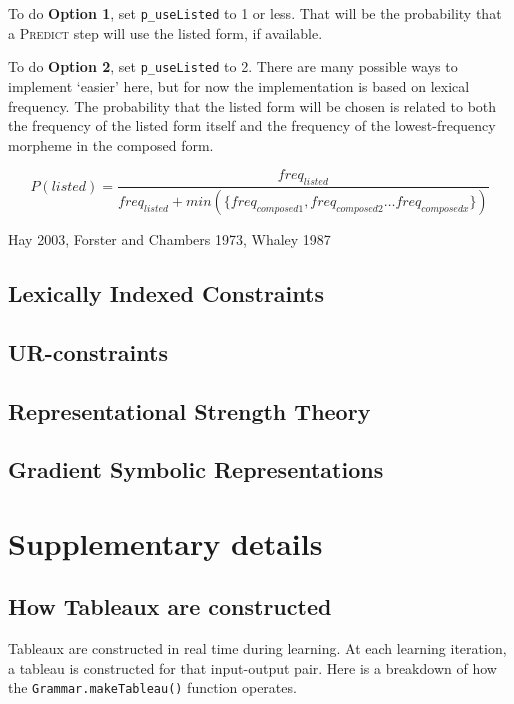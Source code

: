 \documentclass[12]{article}
\begin{document}
		To do {\bf Option 1}, set \texttt{p\_useListed} to 1 or less.  That will be the probability that a \textsc{Predict} step will use the listed form, if available.
		
		To do {\bf Option 2}, set \texttt{p\_useListed} to 2. There are many possible ways to implement `easier' here, but for now the implementation is based on lexical frequency.  The probability that the listed form will be chosen is related to both the frequency of the listed form itself and the frequency of the lowest-frequency morpheme in the composed form.  
		
		\[
		P(listed) = \frac{freq_{listed}}{freq_{listed} + min(\{freq_{composed1}, freq_{composed2}\ldots freq_{composedx}\})}
		\]
		
		Hay 2003, Forster and Chambers 1973, Whaley 1987 %

	\subsection{Lexically Indexed Constraints}

	\subsection{UR-constraints}

	\subsection{Representational Strength Theory}

	\subsection{Gradient Symbolic Representations}


\section{Supplementary details}
	\subsection{How Tableaux are constructed}
	Tableaux are constructed in real time during learning. At each learning iteration, a tableau is constructed for that input-output pair.  Here is a breakdown of how the \texttt{Grammar.makeTableau()} function operates.
	
\end{document}
